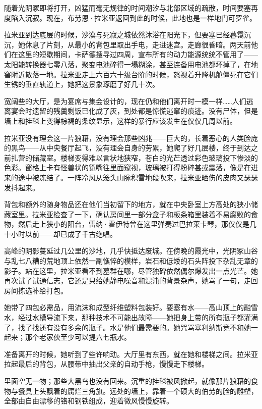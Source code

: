 \documentclass[AutoFakeBold=true]{book}
\begin{document}
随着光阴冢即将打开，凶猛而毫无规律的时间潮汐与北部区域的疏散，时间要塞再度陷入沉寂。现在，布劳恩·拉米亚返回到此的时候，此地也是一样地门可罗雀。

拉米亚到达底层的时候，沙漠与死寂之城依然沐浴在阳光下，但要塞已经暮霭沉沉，她休息了片刻，从最小的背包里取出手电，走进迷宫。走廊很昏暗。两天前他们在这里的短歇期间，卡萨德搜寻过四周，宣布所有的动力能源统统不管用了——太阳能转换器七零八落，聚变电池碎得一塌糊涂，甚至连备用电池都坏掉了，在地窖附近散落一地。拉米亚走上六百六十级台阶的时候，怒视着升降机舱僵死在它们生锈的垂直轨道上，她把这景象琢磨了好几十次。

宽阔些的大厅，是为宴席与集会设计的，现在仍和他们离开时一模一样……人们逃离宴会时遗留的残羹剩饭已化成了灰，到处都是惊慌逃窜的痕迹。没有尸体，但是墙上和挂毯上变得棕褐的条纹显示，这样的暴行应该发生在仅仅几周以前。

拉米亚没有理会这一片狼藉，没有理会那些凶兆——巨大的，长着恶心的人类脸庞的黑鸟——从中央餐厅起飞，没有理会自身的劳累，她爬了好几层楼，终于到达之前扎营的储藏室。楼梯变得难以言状地狭窄，苍白的光芒透过彩色玻璃投下惨淡的色彩。窗格上卡有怪兽状的笕嘴往里面窥视，玻璃被打得粉碎甚或震落，像是在进来的途中被冻结了。一阵冷风从笼头山脉积雪地段吹来，拉米亚晒伤的皮肉又瑟瑟发抖起来。

背包和额外的随身物品还在他们当初留下的地方，就在中央卧室上方高处的狭小储藏室里。拉米亚检查了一下，确认房间里一部分盒子和板条箱里装着不易腐败的食物，然后走上狭小的阳台，雷纳·霍伊特曾在这里弹奏过巴拉莱卡琴，那仅仅是几十小时以前——却已成了千古绝唱。

高峰的阴影蔓延过几公里的沙地，几乎快抵达废城。在傍晚的霞光中，光阴冢山谷与乱七八糟的荒地顶上依然一副憔悴的模样，岩石和低矮的石头阵投下杂乱无章的影子。站在这里，拉米亚看不到墓群在哪，尽管独碑依然偶尔爆发出一点光芒。她再次试了试通信志，它还是只给她静电噪音和混沌的背景杂声，她骂了一句，走回房间拣选补给打包。

她带了四包必需品，用流沫和成型纤维塑料包装好。要塞有水——高山顶上的融雪水，经过水槽导流下来，那种技术不可能出故障——她把身上带的所有瓶子都灌满了，找了找还有没有多余的瓶子。水是他们最需要的。她咒骂塞利纳斯竞不和她一起来；那个老家伙至少可以提六七瓶水。

准备离开的时候，她听到了些许响动。大厅里有东西，就在她和楼梯之间。拉米亚拉起最后的背包，从腰带中抽出父亲的自动手枪，慢慢走下楼梯。

里面空无一物；那些大黑鸟也没有回来。沉重的挂毯被风掀起，就像那片狼藉的食物与餐具上头飘着的腐烂三角旗。远处的墙上，靠着一个硕大的伯劳的脸的雕塑，全部由自由漂移的铬和钢铁组成，迎着微风慢慢旋转。
\end{document}

